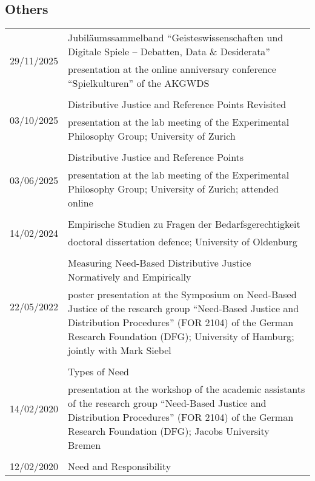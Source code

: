 \documentclass[a4paper,10pt]{article}
\begin{document}
\subsection*{Others}
\begin{longtable}{p{2.5cm}p{11cm}}
\multirow{2}{2.5cm}{\footnotesize{29/11/2025}} & Jubiläumssammelband \enquote{Geisteswissenschaften und Digitale Spiele -- Debatten, Data \& Desiderata}\\
& \footnotesize{presentation at the online anniversary conference \enquote{Spielkulturen} of the AKGWDS}\\
\\
\multirow{2}{2.5cm}{\footnotesize{03/10/2025}} & Distributive Justice and Reference Points Revisited\\
& \footnotesize{presentation at the lab meeting of the Experimental Philosophy Group; University of Zurich}\\
\\
\multirow{2}{2.5cm}{\footnotesize{03/06/2025}} & Distributive Justice and Reference Points\\
& \footnotesize{presentation at the lab meeting of the Experimental Philosophy Group; University of Zurich; attended online}\\
\\
\multirow{2}{2.5cm}{\footnotesize{14/02/2024}} & Empirische Studien zu Fragen der Bedarfsgerechtigkeit\\
& \footnotesize{doctoral dissertation defence; University of Oldenburg}\\
\\
\multirow{2}{2.5cm}{\footnotesize{22/05/2022}} & Measuring Need-Based Distributive Justice Normatively and Empirically\\
& \footnotesize{poster presentation at the Symposium on Need-Based Justice of the research group \enquote{Need-Based Justice and Distribution Procedures} (FOR 2104) of the German Research Foundation (DFG); University of Hamburg; jointly with Mark Siebel}\\
\\
\multirow{2}{2.5cm}{\footnotesize{14/02/2020}} & Types of Need\\
& \footnotesize{presentation at the workshop of the academic assistants of the research group \enquote{Need-Based Justice and Distribution Procedures} (FOR 2104) of the German Research Foundation (DFG); Jacobs University Bremen}\\
\\
\multirow{2}{2.5cm}{\footnotesize{12/02/2020}} & Need and Responsibility\\

\end{longtable}
\end{document}
